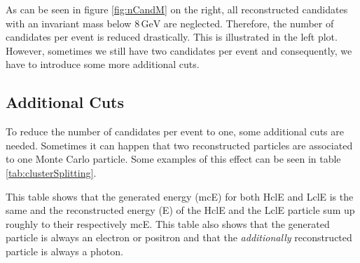 \documentclass[a4paper,11pt,twosided,final,german,openbib,pdftex,listof=totoc,bibliography=totoc]{scrbook}
\begin{document}
As can be seen in figure \ref{fig:nCandM} on the right, all reconstructed candidates with an invariant mass below $8\,\textrm{GeV}$ are neglected. Therefore, the number of candidates per event is reduced drastically. This is illustrated in the left plot. However, sometimes we still have two candidates per event and consequently, we have to introduce some more additional cuts.



\subsection{Additional Cuts}

To reduce the number of candidates per event to one, some additional cuts are needed. Sometimes it can happen that two reconstructed particles are associated to one Monte Carlo particle. Some examples of this effect can be seen in table \ref{tab:clusterSplitting}. 


\begin{table}[h!]
	\centering
	\caption[Cluster Splitting Examples]{Some examples for events with cluster splitting. mcE is the same for LclE and HclE. The energies are in GeV. }
	\label{tab:clusterSplitting}
\end{table}

This table shows that the generated energy (mcE) for both HclE and LclE is the same and the reconstructed energy (E) of the HclE and the LclE particle sum up roughly to their respectively mcE. 
This table also shows that the generated particle is always an electron or positron and that the \textit{additionally} reconstructed particle is always a photon.
\end{document}
